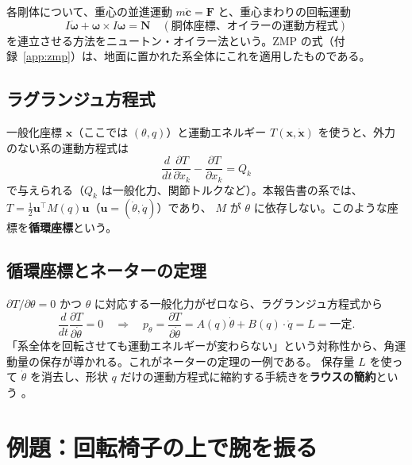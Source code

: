 各剛体について、重心の並進運動 $m\ddot{\bm c} = \bm F$ と、重心まわりの回転運動
\begin{equation}
I\dot{\bm\omega} + \bm\omega\times I\bm\omega = \bm N\quad(\text{胴体座標、オイラーの運動方程式})
\end{equation}
を連立させる方法をニュートン・オイラー法という。ZMP の式（付録~\ref{app:zmp}）は、地面に置かれた系全体にこれを適用したものである。

\subsection{ラグランジュ方程式}

一般化座標 $\bm x$（ここでは $(\theta, q)$）と運動エネルギー $T(\bm x,\dot{\bm x})$ を使うと、外力のない系の運動方程式は
\begin{equation}
\frac{d}{dt}\frac{\partial T}{\partial\dot x_k} - \frac{\partial T}{\partial x_k} = Q_k
\end{equation}
で与えられる（$Q_k$ は一般化力、関節トルクなど）。本報告書の系では、$T = \tfrac12\bm u^\top M(q)\bm u$（$\bm u = (\dot\theta,\dot q)$）であり、
$M$ が $\theta$ に依存しない。このような座標を\textbf{循環座標}という。

\subsection{循環座標とネーターの定理}

$\partial T/\partial\theta = 0$ かつ $\theta$ に対応する一般化力がゼロなら、ラグランジュ方程式から
\begin{equation}
\frac{d}{dt}\frac{\partial T}{\partial\dot\theta} = 0\quad\Longrightarrow\quad p_\theta = \frac{\partial T}{\partial\dot\theta} = A(q)\dot\theta + B(q)\cdot\dot q = L = \text{一定}.
\end{equation}
「系全体を回転させても運動エネルギーが変わらない」という対称性から、角運動量の保存が導かれる。これがネーターの定理の一例である。
保存量 $L$ を使って $\dot\theta$ を消去し、形状 $q$ だけの運動方程式に縮約する手続きを\textbf{ラウスの簡約}という \cite{R5}。

\section{例題：回転椅子の上で腕を振る}

